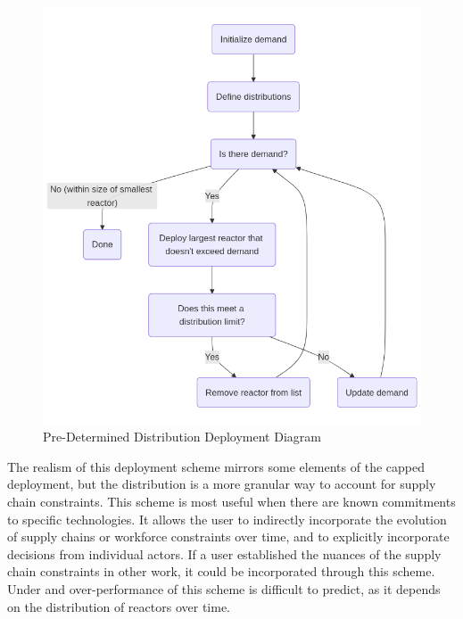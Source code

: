 \begin{figure}[!hp]
    \centering
    \includegraphics[scale=0.4]{images/schemes/pre_det_diagram.png}
    \caption{Pre-Determined Distribution Deployment Diagram}
    \label{fig:pre_det_diagram}
\end{figure}

The realism of this deployment scheme mirrors some elements of the capped
deployment, but the distribution is a more granular way to account for supply
chain constraints. This scheme is most useful when there are known commitments
to specific technologies. It allows the user to indirectly incorporate the
evolution of supply chains or workforce constraints over time, and to
explicitly incorporate decisions from individual actors. If a user established
the nuances of the supply chain constraints in other work, it could be
incorporated through this scheme. Under and over-performance of this scheme is
difficult to predict, as it depends on the distribution of reactors over time.